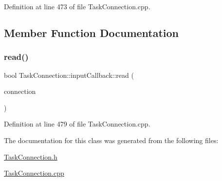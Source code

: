 Definition at line 473 of file Task\+Connection.\+cpp.



\subsection{Member Function Documentation}
\hypertarget{classocra__recipes_1_1TaskConnection_1_1inputCallback_a6572ca3aa11c347ecd414ea760ae89bc}{}\label{classocra__recipes_1_1TaskConnection_1_1inputCallback_a6572ca3aa11c347ecd414ea760ae89bc} 
\subsubsection{\texorpdfstring{read()}{read()}}
{\footnotesize\ttfamily bool Task\+Connection\+::input\+Callback\+::read (\begin{DoxyParamCaption}\item[{yarp\+::os\+::\+Connection\+Reader \&}]{connection }\end{DoxyParamCaption})\hspace{0.3cm}{\ttfamily [virtual]}}



Definition at line 479 of file Task\+Connection.\+cpp.



The documentation for this class was generated from the following files\+:\begin{DoxyCompactItemize}
\item 
\hyperlink{TaskConnection_8h}{Task\+Connection.\+h}\item 
\hyperlink{TaskConnection_8cpp}{Task\+Connection.\+cpp}\end{DoxyCompactItemize}
